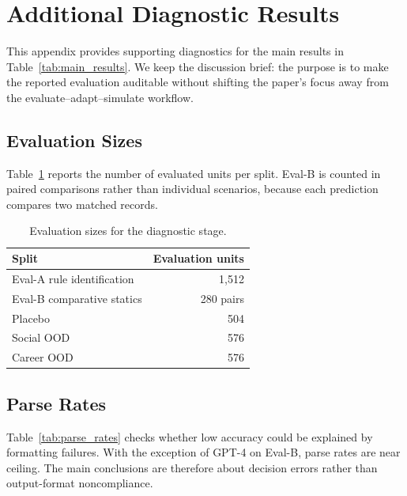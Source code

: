 \section{Additional Diagnostic Results}
\label{app:additional_results}

This appendix provides supporting diagnostics for the main results in
Table~\ref{tab:main_results}. We keep the discussion brief: the purpose is to
make the reported evaluation auditable without shifting the paper's focus away
from the evaluate--adapt--simulate workflow.

\subsection{Evaluation Sizes}

Table~\ref{tab:dataset_sizes} reports the number of evaluated units per split.
Eval-B is counted in paired comparisons rather than individual scenarios,
because each prediction compares two matched records.

\begin{table}[h]
\centering
\small
\begin{tabular}{@{}lr@{}}
\toprule
\textbf{Split} & \textbf{Evaluation units} \\
\midrule
Eval-A rule identification & 1,512 \\
Eval-B comparative statics & 280 pairs \\
Placebo & 504 \\
Social OOD & 576 \\
Career OOD & 576 \\
\bottomrule
\end{tabular}
\caption{Evaluation sizes for the diagnostic stage.}
\label{tab:dataset_sizes}
\end{table}

\subsection{Parse Rates}

Table~\ref{tab:parse_rates} checks whether low accuracy could be explained by
formatting failures. With the exception of GPT-4 on Eval-B, parse rates are
near ceiling. The main conclusions are therefore about decision errors rather
than output-format noncompliance.

